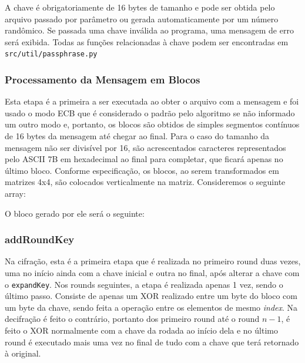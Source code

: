 \documentclass[12pt]{article}
\begin{document}
A chave é obrigatoriamente de 16 bytes de tamanho e pode ser obtida pelo arquivo passado por parâmetro ou gerada automaticamente por um número randômico. Se passada uma chave inválida ao programa, uma mensagem de erro será exibida. Todas as funções relacionadas à chave podem ser encontradas em \texttt{src/util/passphrase.py}

\subsubsection{Processamento da Mensagem em Blocos}
Esta etapa é a primeira a ser executada ao obter o arquivo com a mensagem e foi usado o modo ECB que é considerado o padrão pelo algoritmo se não informado um outro modo e, portanto, os blocos são obtidos de simples segmentos contínuos de 16 bytes da mensagem até chegar ao final. Para o caso do tamanho da mensagem não ser divisível por 16, são acrescentados caracteres representados pelo ASCII 7B em hexadecimal ao final para completar, que ficará apenas no último bloco. Conforme especificação, os blocos, ao serem transformados em matrizes 4x4, são colocados verticalmente na matriz. Consideremos o seguinte array:

\begin{center}
\end{center}

O bloco gerado por ele será o seguinte:

\begin{center}
\end{center}

\subsubsection{addRoundKey}
Na cifração, esta é a primeira etapa que é realizada no primeiro round duas vezes, uma no início ainda com a chave inicial e outra no final, após alterar a chave com o \texttt{expandKey}. Nos rounds seguintes, a etapa é realizada apenas 1 vez, sendo o último passo. Consiste de apenas um XOR realizado entre um byte do bloco com um byte da chave, sendo feita a operação entre os elementos de mesmo \textit{index}. Na decifração é feito o contrário, portanto dos primeiro round até o round $n-1$, é feito o XOR normalmente com a chave da rodada ao início dela e no último round é executado mais uma vez no final de tudo com a chave que terá retornado à original.
\end{document}
